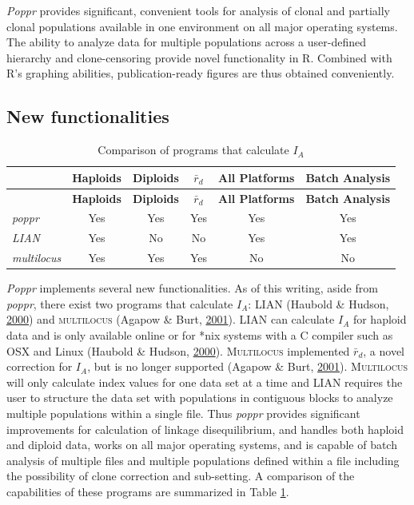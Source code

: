 \documentclass[double,11pt]{beavtex}
\begin{document}
  \emph{Poppr} provides significant, convenient tools for analysis of
  clonal and partially clonal populations available in one environment on
  all major operating systems. The ability to analyze data for multiple
  populations across a user-defined hierarchy and clone-censoring provide
  novel functionality in R. Combined with R's graphing abilities,
  publication-ready figures are thus obtained conveniently.
  
  \subsection{New functionalities}\label{new-functionalities}
  
  \begin{longtable}[]{@{}lccccc@{}}
  \caption{\label{tab:poppr5} Comparison of programs that calculate
  \(I_A\)}\tabularnewline
  \toprule
  & \textbf{Haploids} & \textbf{Diploids} & \(\bar{r}_d\) & \textbf{All
  Platforms} & \textbf{Batch Analysis}\tabularnewline
  \midrule
  \endfirsthead
  \toprule
  & \textbf{Haploids} & \textbf{Diploids} & \(\bar{r}_d\) & \textbf{All
  Platforms} & \textbf{Batch Analysis}\tabularnewline
  \midrule
  \endhead
  \emph{poppr} & Yes & Yes & Yes & Yes & Yes\tabularnewline
  \emph{LIAN} & Yes & No & No & Yes & Yes\tabularnewline
  \emph{multilocus} & Yes & Yes & Yes & No & No\tabularnewline
  \bottomrule
  \end{longtable}
  
  \emph{Poppr} implements several new functionalities. As of this writing,
  aside from \emph{poppr}, there exist two programs that calculate
  \(I_A\): \textsc{LIAN} (Haubold \& Hudson,
  \protect\hyperlink{ref-Haubold:2000}{2000}) and \textsc{multilocus}
  (Agapow \& Burt, \protect\hyperlink{ref-Agapow_2001}{2001}).
  \textsc{LIAN} can calculate \(I_A\) for haploid data and is only
  available online or for *nix systems with a C compiler such as OSX and
  Linux (Haubold \& Hudson, \protect\hyperlink{ref-Haubold:2000}{2000}).
  \textsc{Multilocus} implemented \(\bar{r}_d\), a novel correction for
  \(I_A\), but is no longer supported (Agapow \& Burt,
  \protect\hyperlink{ref-Agapow_2001}{2001}). \textsc{Multilocus} will
  only calculate index values for one data set at a time and \textsc{LIAN}
  requires the user to structure the data set with populations in
  contiguous blocks to analyze multiple populations within a single file.
  Thus \emph{poppr} provides significant improvements for calculation of
  linkage disequilibrium, and handles both haploid and diploid data, works
  on all major operating systems, and is capable of batch analysis of
  multiple files and multiple populations defined within a file including
  the possibility of clone correction and sub-setting. A comparison of the
  capabilities of these programs are summarized in Table \ref{tab:poppr5}.
  
\end{document}
